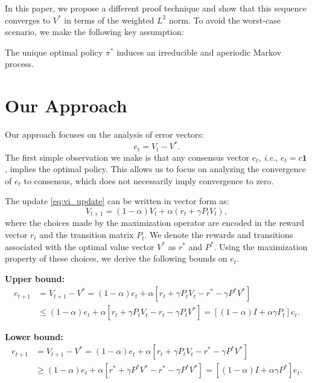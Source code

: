 \documentclass{article}
\begin{document}
In this paper, we propose a different proof technique and show that this sequence converges to $V^*$ in terms of the weighted $L^2$ norm. To avoid the worst-case scenario, we make the following key assumption:

\begin{assumption} \label{as:ergodicity}
The unique optimal policy $\pi^*$ induces an irreducible and aperiodic Markov process.
\end{assumption}

\section{Our Approach}
Our approach focuses on the analysis of error vectors:
\[
e_t = V_t - V^*.
\]
The first simple observation we make is that any consensus vector $e_t$, \textit{i.e.}, $e_t = c\mathbf{1}$, implies the optimal policy. This allows us to focus on analyzing the convergence of $e_t$ to consensus, which does not necessarily imply convergence to zero.

The update \eqref{eq:vi_update} can be written in vector form as:
\begin{equation*}
V_{t+1} = (1-\alpha)V_t + \alpha (r_t + \gamma P_t V_t),
\end{equation*}
where the choices made by the maximization operator are encoded in the reward vector $r_t$ and the transition matrix $P_t$. We denote the rewards and transitions associated with the optimal value vector $V^*$ as $r^*$ and $P^*$. Using the maximization property of these choices, we derive the following bounds on $e_t$. 

\textbf{Upper bound:}
\begin{align}
e_{t+1} &= V_{t+1} - V^* = (1-\alpha)e_t + 
\alpha \left[r_t + \gamma P_t V_t - r^* - \gamma P^* V^* \right] \nonumber \\
&\leq (1-\alpha)e_t +  \alpha \left[r_t + \gamma P_t V_t - r_t - \gamma P_t V^*\right] =
\left[ (1-\alpha) I + \alpha\gamma P_t\right]  e_t. \label{eq:e_upper_bound}
\end{align}

\textbf{Lower bound:}
\begin{align}
e_{t+1} &= V_{t+1} - V^* = (1-\alpha)e_t + 
\alpha \left[r_t + \gamma P_t V_t - r^* - \gamma P^* V^* \right] \nonumber \\
&\geq (1-\alpha)e_t +  \alpha \left[r^* + \gamma P^* V^* - r^* - \gamma P^* V^*\right] =
\left[ (1-\alpha) I + \alpha\gamma P^*\right]  e_t. \label{eq:e_lower_bound}
\end{align}
\end{document}

